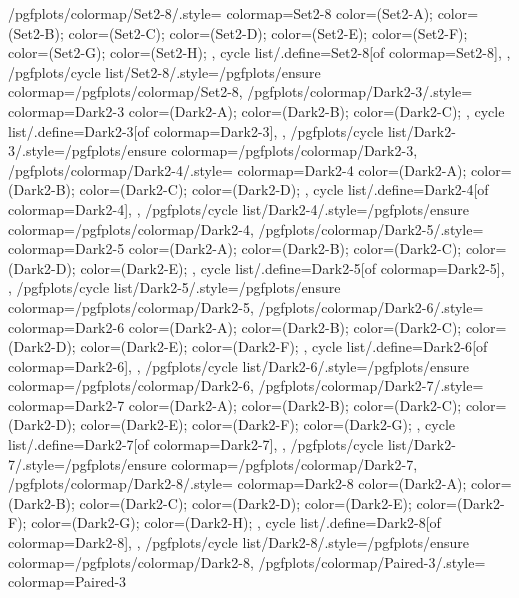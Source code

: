 {  %
  /pgfplots/colormap/Set2-8/.style={
    colormap={Set2-8}{
      color=(Set2-A);
      color=(Set2-B);
      color=(Set2-C);
      color=(Set2-D);
      color=(Set2-E);
      color=(Set2-F);
      color=(Set2-G);
      color=(Set2-H);
    },
    cycle list/.define={Set2-8}{[of colormap=Set2-8]},
  },
  /pgfplots/cycle list/Set2-8/.style={/pgfplots/ensure colormap={/pgfplots/colormap/Set2-8}},
  /pgfplots/colormap/Dark2-3/.style={
    colormap={Dark2-3}{
      color=(Dark2-A);
      color=(Dark2-B);
      color=(Dark2-C);
    },
    cycle list/.define={Dark2-3}{[of colormap=Dark2-3]},
  },
  /pgfplots/cycle list/Dark2-3/.style={/pgfplots/ensure colormap={/pgfplots/colormap/Dark2-3}},
  /pgfplots/colormap/Dark2-4/.style={
    colormap={Dark2-4}{
      color=(Dark2-A);
      color=(Dark2-B);
      color=(Dark2-C);
      color=(Dark2-D);
    },
    cycle list/.define={Dark2-4}{[of colormap=Dark2-4]},
  },
  /pgfplots/cycle list/Dark2-4/.style={/pgfplots/ensure colormap={/pgfplots/colormap/Dark2-4}},
  /pgfplots/colormap/Dark2-5/.style={
    colormap={Dark2-5}{
      color=(Dark2-A);
      color=(Dark2-B);
      color=(Dark2-C);
      color=(Dark2-D);
      color=(Dark2-E);
    },
    cycle list/.define={Dark2-5}{[of colormap=Dark2-5]},
  },
  /pgfplots/cycle list/Dark2-5/.style={/pgfplots/ensure colormap={/pgfplots/colormap/Dark2-5}},
  /pgfplots/colormap/Dark2-6/.style={
    colormap={Dark2-6}{
      color=(Dark2-A);
      color=(Dark2-B);
      color=(Dark2-C);
      color=(Dark2-D);
      color=(Dark2-E);
      color=(Dark2-F);
    },
    cycle list/.define={Dark2-6}{[of colormap=Dark2-6]},
  },
  /pgfplots/cycle list/Dark2-6/.style={/pgfplots/ensure colormap={/pgfplots/colormap/Dark2-6}},
  /pgfplots/colormap/Dark2-7/.style={
    colormap={Dark2-7}{
      color=(Dark2-A);
      color=(Dark2-B);
      color=(Dark2-C);
      color=(Dark2-D);
      color=(Dark2-E);
      color=(Dark2-F);
      color=(Dark2-G);
    },
    cycle list/.define={Dark2-7}{[of colormap=Dark2-7]},
  },
  /pgfplots/cycle list/Dark2-7/.style={/pgfplots/ensure colormap={/pgfplots/colormap/Dark2-7}},
  /pgfplots/colormap/Dark2-8/.style={
    colormap={Dark2-8}{
      color=(Dark2-A);
      color=(Dark2-B);
      color=(Dark2-C);
      color=(Dark2-D);
      color=(Dark2-E);
      color=(Dark2-F);
      color=(Dark2-G);
      color=(Dark2-H);
    },
    cycle list/.define={Dark2-8}{[of colormap=Dark2-8]},
  },
  /pgfplots/cycle list/Dark2-8/.style={/pgfplots/ensure colormap={/pgfplots/colormap/Dark2-8}},
  /pgfplots/colormap/Paired-3/.style={
    colormap={Paired-3}{
}}}
